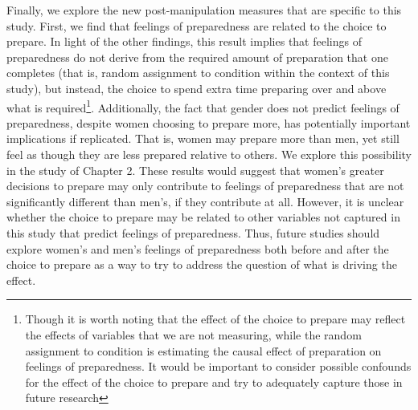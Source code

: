 \documentclass[a4paper, nobind]{templates/ociamthesis}
\begin{document}
Finally, we explore the new post-manipulation measures that are specific to this study. First, we find that feelings of preparedness are related to the choice to prepare. In light of the other findings, this result implies that feelings of preparedness do not derive from the required amount of preparation that one completes (that is, random assignment to condition within the context of this study), but instead, the choice to spend extra time preparing over and above what is required\footnote{Though it is worth noting that the effect of the choice to prepare may reflect the effects of variables that we are not measuring, while the random assignment to condition is estimating the causal effect of preparation on feelings of preparedness. It would be important to consider possible confounds for the effect of the choice to prepare and try to adequately capture those in future research}. Additionally, the fact that gender does not predict feelings of preparedness, despite women choosing to prepare more, has potentially important implications if replicated. That is, women may prepare more than men, yet still feel as though they are less prepared relative to others. We explore this possibility in the study of Chapter 2. These results would suggest that women's greater decisions to prepare may only contribute to feelings of preparedness that are not significantly different than men's, if they contribute at all. However, it is unclear whether the choice to prepare may be related to other variables not captured in this study that predict feelings of preparedness. Thus, future studies should explore women's and men's feelings of preparedness both before and after the choice to prepare as a way to try to address the question of what is driving the effect.
\end{document}
